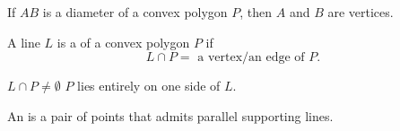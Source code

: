 \begin{frame}{}
  \begin{center}
    {}
  \end{center}

  \vspace{0.30cm}
\end{frame}

\begin{frame}{}
  \begin{theorem}[DH 4-8]
    If $AB$ is a diameter of a convex polygon $P$, then $A$ and $B$ are vertices.
  \end{theorem}

  \pause
  \begin{center}
    
  \end{center}

\end{frame}

\begin{frame}{}
  \begin{definition}
    A line $L$ is a  of a convex polygon $P$ if
    \[
      L \cap P = \text{ a vertex/an edge of } P.
    \]
  \end{definition}


  \pause
  \vspace{0.20cm}
  \begin{center}
    {$L \cap P \neq \emptyset$ \qquad $P$ lies entirely on one side of $L$.}
  \end{center}
\end{frame}

\begin{frame}{}
  \begin{definition}[Antipodal]
    An  is a pair of points that admits parallel supporting lines.
  \end{definition}


  \pause
  \begin{center}
    {}
  \end{center}
\end{frame}

